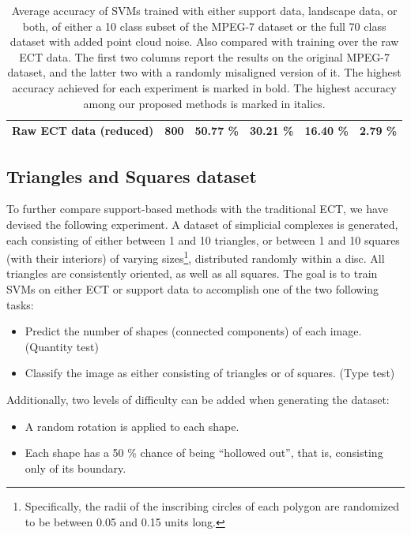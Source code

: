 \documentclass[a4paper]{article}
\begin{document}
\begin{table}[]
\begin{tabular}{l|l|l|l|l|l|}
 		\multicolumn{1}{|l|}{Raw ECT data (reduced)}       & 800                                                         & 50.77 \%                                                     & 30.21 \%                                                     & 16.40 \%                                                           & 2.79 \%                                                            \\ \hline
 	\end{tabular}
 	\caption{Average accuracy of SVMs trained with either support data, landscape data, or both, of either a 10 class subset of the MPEG-7 dataset or the full 70 class dataset with added point cloud noise. Also compared with training over the raw ECT data. The first two columns report the results on the original MPEG-7 dataset, and the latter two with a randomly misaligned version of it. The highest accuracy achieved for each experiment is marked in bold. The highest accuracy among our proposed methods is marked in italics.}
 	 \label{AccNoisy}
 \end{table}
 
 
 
 \subsection{Triangles and Squares dataset}
 
 To further compare support-based methods with the traditional ECT, we have devised the following experiment. A dataset of simplicial complexes is generated, each consisting of either between 1 and 10 triangles, or between 1 and 10 squares (with their interiors) of varying sizes\footnote{Specifically, the radii of the inscribing circles of each polygon are randomized to be between 0.05 and 0.15 units long.}, distributed randomly within a disc. All triangles are consistently oriented, as well as all squares. The goal is to train SVMs on either ECT or support data to accomplish one of the two following tasks:
 \begin{itemize}
 	\item Predict the number of shapes (connected components) of each image. (Quantity test)
 	\item Classify the image as either consisting of triangles or of squares. (Type test)
 \end{itemize}
 Additionally, two levels of difficulty can be added when generating the dataset:
 \begin{itemize}
 	\item A random rotation is applied to each shape.
 	\item Each shape has a 50 \% chance of being ``hollowed out'', that is, consisting only of its boundary.
 \end{itemize}
 
\end{document}
